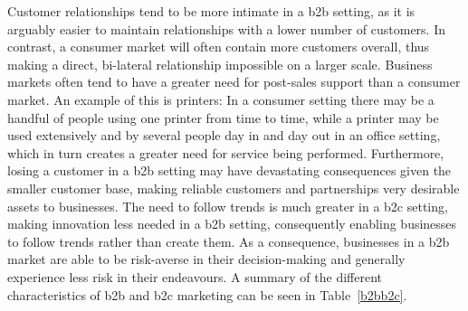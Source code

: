 Customer relationships tend to be more intimate in a \gls{b2b} setting, as it is arguably easier to maintain relationships with a lower number of customers. In contrast, a consumer market will often contain more customers overall, thus making a direct, bi-lateral relationship impossible on a larger scale. Business markets often tend to have a greater need for post-sales support than a consumer market. An example of this is printers: In a consumer setting there may be a handful of people using one printer from time to time, while a printer may be used extensively and by several people day in and day out in an office setting, which in turn creates a greater need for service being performed. Furthermore, losing a customer in a \gls{b2b} setting may have devastating consequences given the smaller customer base, making reliable customers and partnerships very desirable assets to businesses. The need to follow trends is much greater in a \gls{b2c} setting, making innovation less needed in a \gls{b2b} setting, consequently enabling businesses to follow trends rather than create them. As a consequence, businesses in a \gls{b2b} market are able to be risk-averse in their decision-making and generally experience less risk in their endeavours. A summary of the different characteristics of \gls{b2b} and \gls{b2c} marketing can be seen in Table~\ref{b2bb2c}.



